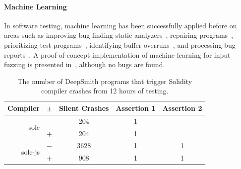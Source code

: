 








\paragraph{Machine Learning} In software testing,
machine learning has been successfully applied before on areas such as improving bug finding static analyzers~\cite{Heo2017,Koc2017}, repairing programs~\cite{Koukoutos2017a,White}, prioritizing test programs~\cite{Chen2017}, identifying buffer overruns~\cite{Choi2016}, and processing bug reports~\cite{Lam2016,Huo2016}. A proof-of-concept implementation of machine learning for input fuzzing is presented in~\cite{Godefroid2017}, although no bugs are found. %

\begin{table}
	\footnotesize %
	\centering %
	\begin{tabular}{rc|ccc}
\toprule
  \textbf{Compiler} & $\pm$ & \textbf{Silent Crashes} & \textbf{Assertion 1} & \textbf{Assertion 2}\\
\midrule
  \multirow{ 2}{*}{solc} & $-$ & 204 & 1 & \\
                         & $+$ & 204 & 1 & \\
  \hline
  \multirow{ 2}{*}{solc-js} & $-$ & 3628 & 1 & 1\\
                         & $+$ & 908 & 1 & 1\\
\bottomrule
\end{tabular}
	\caption{%
		The number of DeepSmith programs that trigger Solidity compiler crashes from 12 hours of testing.%
     \vspace{-1em}
	}
   \vspace{-2em}
	\label{tab:solidity}
\end{table}

